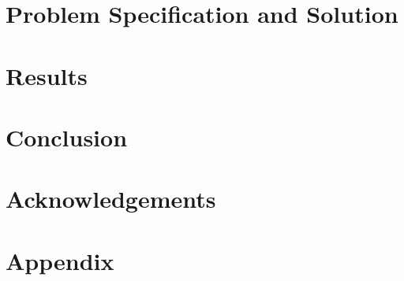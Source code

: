 \documentclass[12pt]{report}
\begin{document}
\chapter{Problem Specification and Solution}


\chapter{Results}


\chapter{Conclusion}


 


\chapter*{Acknowledgements}


\chapter*{Appendix}

\end{document}
